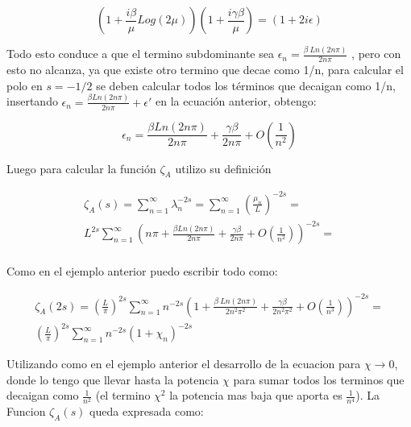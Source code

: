 \begin{equation}
(1 + \frac{i \beta}{ \mu} Log( 2 \mu) ) 
(1 + \frac{i  \gamma \beta}{ \mu})  =
(1 + 2 i \epsilon)
\end{equation}

Todo esto conduce a que el termino subdominante sea $\epsilon _n =  \frac{\beta \ Ln(2 n \pi)}{2 n \pi}$ , pero con esto no alcanza, ya que existe otro termino que decae como 1/n, para calcular el polo en $s=-1/2$ se deben calcular todos los términos que decaigan como 1/n, insertando $\epsilon _n =  \frac{\beta Ln(2 n \pi)}{2 n \pi} + \epsilon '$ en la ecuación anterior, obtengo:


\begin{equation}
    \epsilon _n =  \frac{\beta Ln(2 n \pi)}{2 n \pi} +
                \frac{\gamma \beta}{2 n \pi} +
                O(\frac{1}{n^2})
\end{equation}

Luego para calcular la función $\zeta _{A}$ utilizo su definición

\begin{equation}
\begin{array}{c}
    \zeta _A (s) = \sum _{n=1} ^{\infty} \lambda _n ^{-2 s}  =
    \sum _{n=1} ^{\infty} \left(\frac{\mu _n}{L} \right) ^{-2 s} =  \\
    L ^{2 s} \sum _{n=1} ^{\infty} 
    \left( 
    n \pi + \frac{\beta Ln(2 n \pi)}{2 n \pi} + \frac{\gamma \beta}{2 n \pi} +
    O(\frac{1}{n^2})
    \right) ^{-2s} = \\
    
\end{array}
\end{equation}

Como en el ejemplo anterior puedo escribir todo como:

\begin{equation}
\begin{array}{c}
    \zeta _A (2 s) = \left( \frac{L}{\pi} \right)  ^{2 s} 
    \sum _{n=1} ^{\infty} n ^{- 2  s}
    \left(
    1 + \frac{\beta \ Ln(2 n \pi)}{2 n^2 \pi ^2} + \frac{\gamma \beta}{2 n^2 \pi ^2 } +
    O \left( \frac{1}{n^3} \right)  \right) ^{-2 s} = \\
    ( \frac{L}{\pi} ) ^{2 s}
    \sum _{n=1} ^{\infty} n ^{-2 s} 
    \left(
    1 + \chi _n \right) ^{- 2 s}
\end{array}
\end{equation}

Utilizando como en el ejemplo anterior el desarrollo de la ecuacion para $\chi \rightarrow 0$, donde lo tengo que llevar hasta la potencia $ \chi  $ para sumar todos los terminos que decaigan como $\frac{1}{n ^2}$ (el termino $\chi ^2 $ la potencia mas baja que aporta es $\frac{1}{n ^4}$). La Funcion $\zeta _A (s)$ queda expresada como:


